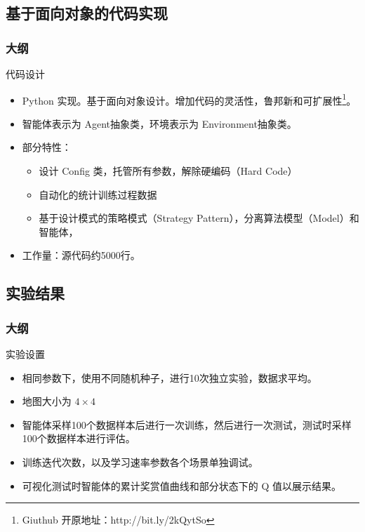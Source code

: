 \documentclass{beamer}
\begin{document}
\subsection{基于面向对象的代码实现}
\begin{frame}
\frametitle{大纲} %
\tableofcontents
    [
        currentsection,
        currentsubsection,
        subsectionstyle=show/shaded/hide
    ]
\end{frame}

\begin{frame}{代码设计}
\begin{itemize}
    \item Python 实现。基于面向对象设计。增加代码的灵活性，鲁邦新和可扩展性\footnote{Giuthub 开原地址：http://bit.ly/2kQytSo}。
    \item 智能体表示为 Agent抽象类，环境表示为 Environment抽象类。
    \item 部分特性：
        \begin{itemize}
            \item 设计 Config 类，托管所有参数，解除硬编码（Hard Code）
            \item 自动化的统计训练过程数据
            \item 基于设计模式的策略模式（Strategy Pattern），分离算法模型（Model）和智能体，
        \end{itemize}
    \item 工作量：源代码约5000行。
\end{itemize}
\end{frame}

\subsection{实验结果}

\begin{frame}
\frametitle{大纲} %
\tableofcontents
    [
        currentsection,
        currentsubsection,
        subsectionstyle=show/shaded/hide
    ]
\end{frame}

\begin{frame}{实验设置}
    \begin{itemize}
        \item 相同参数下，使用不同随机种子，进行10次独立实验，数据求平均。
        \item 地图大小为 $4\times 4$
        \item 智能体采样100个数据样本后进行一次训练，然后进行一次测试，测试时采样100个数据样本进行评估。
        \item 训练迭代次数，以及学习速率参数各个场景单独调试。
        \item 可视化测试时智能体的累计奖赏值曲线和部分状态下的 Q 值以展示结果。
    \end{itemize}
\end{frame}
\end{document}
